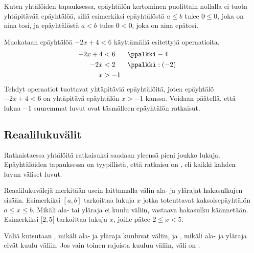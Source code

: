 
Kuten yhtälöiden tapauksessa, epäyhtälön kertominen puolittain nollalla ei tuota yhtäpitävää epäyhtälöä, sillä esimerkiksi epäyhtälöstä $a \leq b$ tulee $0 \leq 0$, joka on aina tosi, ja epäyhtälöstä $a < b$ tulee $0 < 0$, joka on aina epätosi.

\begin{esimerkki}
Muokataan epäyhtälöä $-2x+4<6$ käyttämällä esitettyjä operaatioita.
\begin{align*}
-2x+4&<6 && \ppalkki -4 \\
-2x&<2 && \ppalkki :(-2) \\
x&>-1
\end{align*}
Tehdyt operaatiot tuottavat yhtäpitäviä epäyhtälöitä, joten epäyhtälö $-2x+4<6$ on yhtäpitävä epäyhtälön $x>-1$ kanssa. Voidaan päätellä, että lukua $-1$ suuremmat luvut ovat täsmälleen epäyhtälön ratkaisut.
\end{esimerkki}

\subsection*{Reaalilukuvälit}

Ratkaistaessa yhtälöitä ratkaisuksi saadaan yleensä pieni joukko lukuja. Epäyhtälöiden tapauksessa on tyypillistä, että ratkaisu on , eli kaikki kahden luvun väliset luvut.

Reaalilukuvälejä merkitään usein laittamalla välin ala- ja ylärajat hakasulkujen sisään.  Esimerkiksi $[a, b]$ tarkoittaa lukuja $x$ jotka toteuttavat kaksoisepäyhtälön $a \leq x \leq b$. Mikäli ala- tai yläraja ei kuulu väliin, vastaava hakasulku käännetään. Esimerkiksi $[2,5[$ tarkoittaa lukuja $x$, joille pätee $2 \leq x < 5$.

Väliä kutsutaan , mikäli ala- ja yläraja kuuluvat väliin, ja , mikäli ala- ja yläraja eivät kuulu väliin. Jos vain toinen rajoista kuuluu väliin, väli on .

